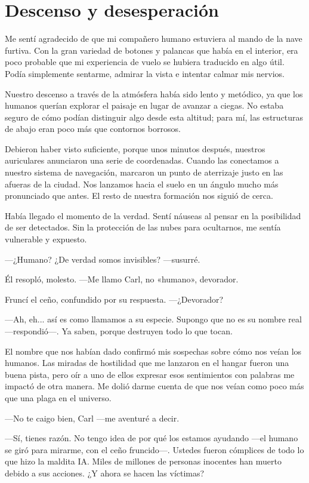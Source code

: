\chapter{Descenso y desesperación}\label{sec:descenso-y-desesperacion}

Me sentí agradecido de que mi compañero humano estuviera al mando de la nave furtiva. Con la gran variedad de botones y palancas que había en el interior, era poco probable que mi experiencia de vuelo se hubiera traducido en algo útil. Podía simplemente sentarme, admirar la vista e intentar calmar mis nervios.

Nuestro descenso a través de la atmósfera había sido lento y metódico, ya que los humanos querían explorar el paisaje en lugar de avanzar a ciegas. No estaba seguro de cómo podían distinguir algo desde esta altitud; para mí, las estructuras de abajo eran poco más que contornos borrosos.

Debieron haber visto suficiente, porque unos minutos después, nuestros auriculares anunciaron una serie de coordenadas. Cuando las conectamos a nuestro sistema de navegación, marcaron un punto de aterrizaje justo en las afueras de la ciudad. Nos lanzamos hacia el suelo en un ángulo mucho más pronunciado que antes. El resto de nuestra formación nos siguió de cerca.

Había llegado el momento de la verdad. Sentí náuseas al pensar en la posibilidad de ser detectados. Sin la protección de las nubes para ocultarnos, me sentía vulnerable y expuesto.

—¿Humano? ¿De verdad somos invisibles? —susurré.

Él resopló, molesto. —Me llamo Carl, no «humano», devorador.

Fruncí el ceño, confundido por su respuesta. —¿Devorador?

—Ah, eh... así es como llamamos a su especie. Supongo que no es su nombre real —respondió—. Ya saben, porque destruyen todo lo que tocan.

El nombre que nos habían dado confirmó mis sospechas sobre cómo nos veían los humanos. Las miradas de hostilidad que me lanzaron en el hangar fueron una buena pista, pero oír a uno de ellos expresar esos sentimientos con palabras me impactó de otra manera. Me dolió darme cuenta de que nos veían como poco más que una plaga en el universo.

—No te caigo bien, Carl —me aventuré a decir.

—Sí, tienes razón. No tengo idea de por qué los estamos ayudando —el humano se giró para mirarme, con el ceño fruncido—. Ustedes fueron cómplices de todo lo que hizo la maldita IA. Miles de millones de personas inocentes han muerto debido a sus acciones. ¿Y ahora se hacen las víctimas?

